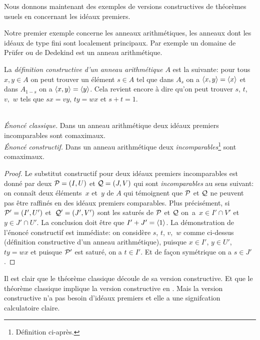 Nous donnons maintenant des exemples de versions constructives de 
théorèmes usuels en \clama concernant les idéaux premiers.


Notre premier exemple concerne les anneaux arithmétiques, 
\cad les anneaux dont les idéaux de type fini sont localement 
principaux.
Par exemple un domaine de Prüfer ou de Dedekind est un anneau 
arithmétique. 

La \emph{définition constructive d'un anneau 
arithmétique $A$} est la suivante:  pour tous $x,y\in A$ on peut 
trouver un élément $s\in A$ tel que dans $A_s$ on a  
$\left\langle{x,y}\right\rangle=\left\langle{x}\right\rangle$
et dans  $A_{1-s}$ on a  $\left\langle{x,y}\right\rangle=\left\langle{y}\right\rangle$. Cela revient encore à dire 
qu'on peut trouver $s$, $t$, $v,$ $w$ tels que $sx=vy$, $ty=wx$ et $s+t=1$.

\begin{lemma} 
\label{lemAritCom}~ 
\\
\emph{\'Enoncé classique.} Dans un anneau arithmétique deux idéaux 
premiers incomparables sont comaximaux.\\
\emph{\'Enoncé constructif.} Dans un anneau arithmétique deux \prois 
\emph{incomparables}\footnote{Définition ci-après.} sont comaximaux.
\end{lemma}
\begin{proof}
Le substitut constructif pour deux idéaux premiers incomparables est 
donné par deux \prois ${\cal P}=(I,U)$ et ${\cal Q}=(J,V)$ qui sont \emph{incomparables} au 
sens suivant: on connaît deux éléments~$x$ et~$y$  de $A$ qui 
témoignent que ${\cal P}$ et ${\cal Q}$ ne peuvent pas être raffinés en des 
idéaux premiers comparables. 
Plus précisément, si~${\cal P}'=(I',U')$ et~${\cal Q}'=(J',V')$ sont les 
saturés de
${\cal P}$ et ${\cal Q}$ \hbox{on a $x\in I'\cap V'$} \hbox{et $y\in J'\cap U'$}. 
La conclusion doit être que $I'+J'=\left\langle{1}\right\rangle$. La démonstration de l'énoncé constructif est immédiate:
on considère  $s$, $t$, $v,$ $w$ comme ci-dessus 
(définition constructive d'un anneau arithmétique),
puisque $x\in I'$, $y\in U'$,  $ty=wx$ et puisque ${\cal P}'$ est saturé, 
on a $t\in I'$. Et de façon symétrique on a $s\in J'$. 
\end{proof}

Il est clair que le théorème classique découle de sa version 
constructive. Et que le théorème classique implique la version 
constructive en \clama. Mais la version constructive n'a pas besoin 
d'idéaux premiers et elle a une signifcation calculatoire claire.



